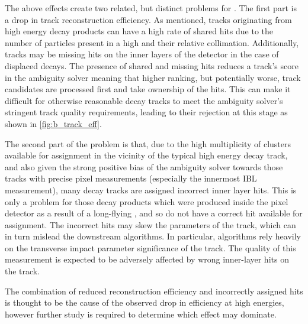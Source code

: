 The above effects create two related, but distinct problems for \btagging.
The first part is a drop in track reconstruction efficiency.
As mentioned, tracks originating from high energy \bhadron decay products can have a high rate of shared hits due to the number of particles present in a high \pT \bjet and their relative collimation.
Additionally, tracks may be missing hits on the inner layers of the detector in the case of displaced decays.
The presence of shared and missing hits reduces a track's score in the ambiguity solver meaning that higher ranking, but potentially worse, track candidates are processed first and take ownership of the hits.
This can make it difficult for otherwise reasonable \bhadron decay tracks to meet the ambiguity solver's stringent track quality requirements, leading to their rejection at this stage as shown in \cref{fig:b_track_eff}.


The second part of the problem is that, due to the high multiplicity of clusters available for assignment in the vicinity of the typical high energy \bhadron decay track, and also given the strong positive bias of the ambiguity solver towards those tracks with precise pixel measurements (especially the innermost IBL measurement), many \bhadron decay tracks are assigned incorrect inner layer hits.
This is only a problem for those decay products which were produced inside the pixel detector as a result of a long-flying \bhadron, and so do not have a correct hit available for assignment.
The incorrect hits may skew the parameters of the track, which can in turn mislead the downstream \btagging algorithms.
In particular, \btagging algorithms rely heavily on the transverse impact parameter significance \dzerosig of the track.
The quality of this measurement is expected to be adversely affected by wrong inner-layer hits on the track. 

The combination of reduced reconstruction efficiency and incorrectly assigned hits is thought to be the cause of the observed drop in \btagging efficiency at high energies, however further study is required to determine which effect may dominate.








